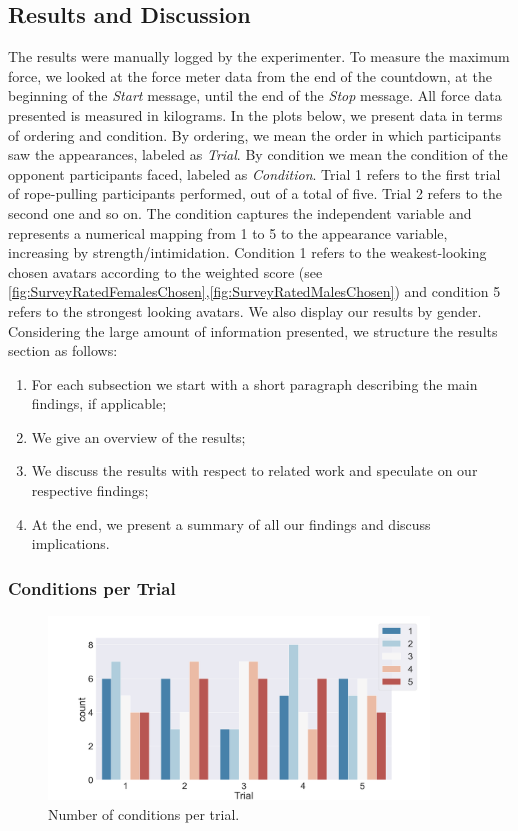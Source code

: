 \subsection{Results and Discussion}
The results were manually logged by the experimenter. To measure the maximum force, we looked at the force meter data from the end of the countdown, at the beginning of the \textit{Start} message, until the end of the \textit{Stop} message. All force data presented is measured in kilograms. In the plots below, we present data in terms of ordering and condition. By ordering, we mean the order in which participants saw the appearances, labeled as \textit{Trial}. By condition we mean the condition of the opponent participants faced, labeled as \textit{Condition}. Trial 1 refers to the first trial of rope-pulling participants performed, out of a total of five. Trial 2 refers to the second one and so on. The condition captures the independent variable and represents a numerical mapping from 1 to 5 to the appearance variable, increasing by strength/intimidation. Condition 1 refers to the weakest-looking chosen avatars according to the weighted score (see \ref{fig:SurveyRatedFemalesChosen},\ref{fig:SurveyRatedMalesChosen}) and condition 5 refers to the strongest looking avatars. We also display our results by gender. \\
Considering the large amount of information presented, we structure the results section as follows:
\begin{enumerate}
\itemsep0.1em
    \item For each subsection we start with a short paragraph describing the main findings, if applicable;
    \item We give an overview of the results;
    \item We discuss the results with respect to related work and speculate on our respective findings;
    \item At the end, we present a summary of all our findings and discuss implications.
\end{enumerate}

\subsubsection{Conditions per Trial}
\begin{figure}[H]
\vspace*{-3mm}
 \centering
 \captionsetup{justification=centering,margin=0.1cm}
\includegraphics[width=0.9\textwidth]{Files/Plots/condition_by_trial.png}
 \caption{Number of conditions per trial.}
 \label{fig:condPerTrial}
  \end{figure}

